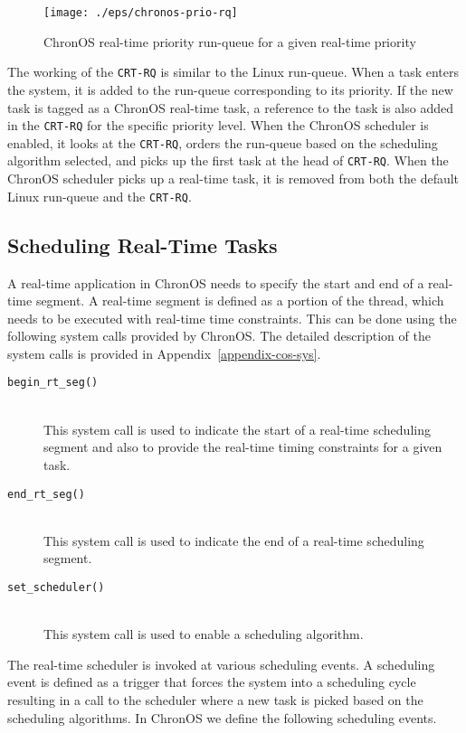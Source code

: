 \documentclass[12pt,dvips]{report}
\begin{document}
\begin{figure} [htbp]
  \centering
  \texttt{[image: ./eps/chronos-prio-rq]}
  \caption{ChronOS real-time priority run-queue for a given real-time priority}
  \label{fig:chronos-prio}
\end{figure}

The working of the \texttt{CRT-RQ} is similar to the Linux run-queue. When a task enters the system, it is added to the run-queue corresponding to its priority. If the new task is tagged as a ChronOS real-time task, a reference to the task is also added in the \texttt{CRT-RQ} for the specific priority level. When the ChronOS scheduler is enabled, it looks at the \texttt{CRT-RQ}, orders the run-queue based on the scheduling algorithm selected, and picks up the first task at the head of \texttt{CRT-RQ}. When the ChronOS scheduler picks up a real-time task, it is removed from both the default Linux run-queue and the \texttt{CRT-RQ}.

\subsection{Scheduling Real-Time Tasks}

A real-time application in ChronOS needs to specify the start and end of a real-time segment. A real-time segment is defined as a portion of the thread, which needs to be executed with real-time time constraints. This can be done using the following system calls provided by ChronOS. The detailed description of the system calls is provided in Appendix~\ref{appendix-cos-sys}.

\begin{description}
	\item[\texttt{begin\_rt\_seg()}] \hfill \\
		This system call is used to indicate the start of a real-time scheduling segment
		and also to provide the real-time timing constraints for a given task.
	
	\item[\texttt{end\_rt\_seg()}] \hfill \\
		This system call is used to indicate the end of a real-time scheduling segment.
	
	\item[\texttt{set\_scheduler()}] \hfill \\
		This system call is used to enable a scheduling algorithm.
\end{description}

The real-time scheduler is invoked at various scheduling events. A scheduling event is defined as a trigger that forces the system into a scheduling cycle resulting in a call to the scheduler where a new task is picked based on the scheduling algorithms. In ChronOS we define the following scheduling events.
\end{document}
